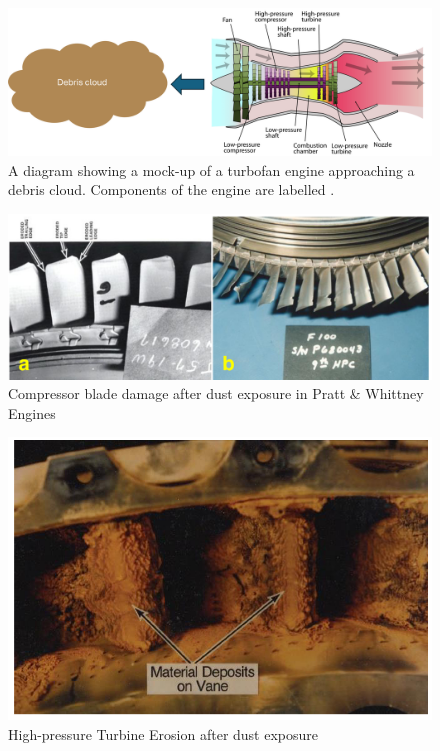 \documentclass{UCF_ETD}
\begin{document}
\begin{figure}[htp!]
\centering
\includegraphics[width=.9\textwidth]{Figures/debrisCloudtoEngine.png}
\caption{A diagram showing a mock-up of a turbofan engine approaching a debris cloud. Components of the engine are labelled \cite{low-bypass_turbofan}.}
\label{fig:fan_debris}
\end{figure}


\begin{figure}[htp!]
\centering
\includegraphics[width=.9\textwidth]{Figures/compressorBladeDamage.png}
\caption{Compressor blade damage after dust exposure in Pratt \& Whittney Engines \cite{Grindle}}
\label{fig:compressorBladeDamage}
\end{figure}

\begin{figure}[htp!]
\centering
\includegraphics[width=.9\textwidth]{Figures/HPT_damage.png}
\caption{High-pressure Turbine Erosion after dust exposure\cite{Grindle}}
\label{fig:HPT_erosion}
\end{figure}
\end{document}
